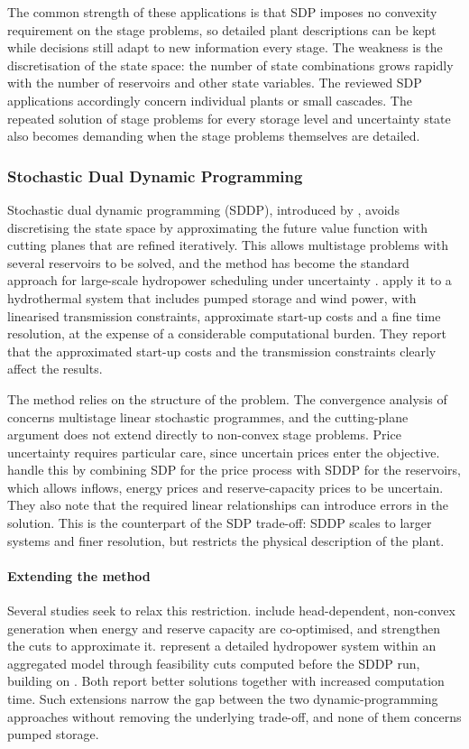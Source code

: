The common strength of these applications is that SDP imposes no
convexity requirement on the stage problems, so detailed plant
descriptions can be kept while decisions still adapt to new information
every stage. The weakness is the discretisation of the state space: the
number of state combinations grows rapidly with the number of reservoirs
and other state variables. The reviewed SDP applications accordingly
concern individual plants or small cascades. The repeated solution of
stage problems for every storage level and uncertainty state also
becomes demanding when the stage problems themselves are detailed.

\subsubsection{Stochastic Dual Dynamic Programming}

Stochastic dual dynamic programming (SDDP), introduced by
\citet{pereira1991}, avoids discretising the state space by
approximating the future value function with cutting planes that are
refined iteratively. This allows multistage problems with several
reservoirs to be solved, and the method has become the standard approach
for large-scale hydropower scheduling under uncertainty
\citep{fullnerRebennack2025}. \citet{helseth2013} apply it to a
hydrothermal system that includes pumped storage and wind power, with
linearised transmission constraints, approximate start-up costs and a
fine time resolution, at the expense of a considerable computational
burden. They report that the approximated start-up costs and the
transmission constraints clearly affect the results.

The method relies on the structure of the problem. The convergence
analysis of \citet{shapiro2011} concerns multistage linear stochastic
programmes, and the cutting-plane argument does not extend directly to
non-convex stage problems. Price uncertainty requires particular care,
since uncertain prices enter the objective. \citet{helseth2016} handle
this by combining SDP for the price process with SDDP for the
reservoirs, which allows inflows, energy prices and reserve-capacity
prices to be uncertain. They also note that the required linear
relationships can introduce errors in the solution. This is the
counterpart of the SDP trade-off: SDDP scales to larger systems and
finer resolution, but restricts the physical description of the plant.

\paragraph{Extending the method}
Several studies seek to relax this restriction.
\citet{hjelmeland2019energies} include head-dependent, non-convex
generation when energy and reserve capacity are co-optimised, and
strengthen the cuts to approximate it. \citet{helseth2024approximating}
represent a detailed hydropower system within an aggregated model
through feasibility cuts computed before the SDDP run, building on
\citet{helseth2023hydropowera}. Both report better solutions together
with increased computation time. Such extensions narrow the gap between
the two dynamic-programming approaches without removing the underlying
trade-off, and none of them concerns pumped storage.

